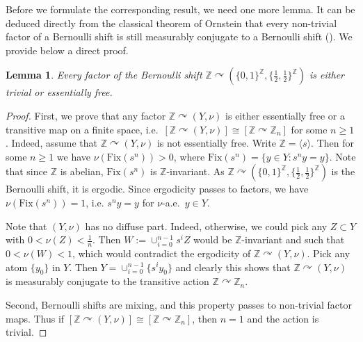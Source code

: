\documentclass[11pt]{amsart}
\newcommand{\Z}{\mathbb Z}
\theoremstyle{plain}
\newtheorem{lemma}[theorem]{Lemma}
\theoremstyle{definition}
\theoremstyle{remark}
\numberwithin{equation}{section}
\begin{document}
Before we formulate the corresponding result, we need one more lemma. It can be deduced directly from the classical theorem of Ornstein that every non-trivial factor of a Bernoulli shift is still measurably conjugate to a  Bernoulli shift (\cite{orn}). We provide below a direct proof.

\begin{lemma} Every factor of the Bernoulli shift $\mathbb{Z}\curvearrowright (\{0,1\}^{\mathbb{Z}}, \{\frac{1}{2},\frac{1}{2}\}^{\mathbb{Z}})$ is either trivial or essentially free. 
\end{lemma}
\begin{proof}
First, we prove that any factor $\mathbb{Z}\curvearrowright (Y,\nu)$ is either essentially free or a transitive map on a finite space, i.e.\ $[\mathbb{Z}\curvearrowright (Y,\nu)]\cong [\mathbb{Z}\curvearrowright \Z_n]$ for some $n\geq 1$. Indeed, assume that $\mathbb{Z}\curvearrowright(Y,\nu)$ is not essentially free. Write $\mathbb{Z}=\langle s\rangle$. 
Then for some $n\geq 1$ we have $\nu(\text{Fix}(s^n))>0$, where $\text{Fix}(s^n)=\{y\in Y: s^ny=y\}$. Note that since $\mathbb{Z}$ is abelian, $\text{Fix}(s^n)$ is $\mathbb{Z}$-invariant. As $\mathbb{Z}\curvearrowright (\{0,1\}^{\mathbb{Z}}, \{\frac{1}{2},\frac{1}{2}\}^{\mathbb{Z}})$ is the Bernoulli shift, it is ergodic. Since ergodicity passes to factors, we have $\nu(\text{Fix}(s^n))=1$, i.e. $s^ny=y$ for $\nu$-a.e.\ $y\in Y$.

Note that $(Y,\nu)$ has no diffuse part. Indeed, otherwise, we could pick any $Z\subset Y$ with $0<\nu(Z)<\frac{1}{n}$. Then $W:=\cup_{i=0}^{n-1}s^iZ$ would be $\mathbb{Z}$-invariant and such that $0<\nu(W)<1$, which would contradict the ergodicity of $\mathbb{Z}\curvearrowright (Y,\nu)$. Pick any atom $\{y_0\}$ in $Y$. Then $Y=\cup_{i=0}^{n-1}\{s^iy_0\}$ and clearly this shows that $\mathbb{Z}\curvearrowright (Y,\nu)$ is measurably conjugate to the transitive action $\mathbb{Z}\curvearrowright\mathbb{Z}_n$.

Second, Bernoulli shifts are mixing, and this property passes to non-trivial factor maps. Thus if $[\mathbb{Z}\curvearrowright (Y,\nu)]\cong [\mathbb{Z}\curvearrowright \mathbb{Z}_n]$, then $n=1$ and the action is trivial.
\end{proof}
\end{document}
